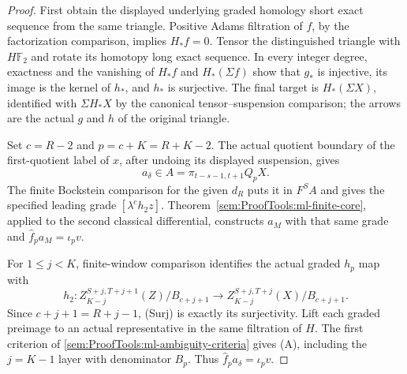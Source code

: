 \begin{proof}
First obtain the displayed underlying graded homology short exact
sequence from the same triangle. Positive Adams filtration of $f$,
by the factorization comparison, implies $H_*f=0$.
Tensor the distinguished triangle with $H\mathbb F_2$ and rotate its
homotopy long exact sequence. In every integer degree, exactness
and the vanishing of $H_*f$ and $H_*(\Sigma f)$ show that $g_*$ is
injective, its image is the kernel of $h_*$, and $h_*$ is surjective.
The final target is $H_*(\Sigma X)$, identified with $\Sigma H_*X$
by the canonical tensor--suspension comparison; the arrows are the
actual $g$ and $h$ of the original triangle.

Set $c=R-2$ and $p=c+K=R+K-2$. The actual quotient boundary of the
first-quotient label of $x$, after undoing its displayed suspension, gives
\[
 a_\delta\in A=\pi_{t-s-1,t+1}Q_pX.
\]
The finite Bockstein comparison for the given $d_R$ puts it in $F^SA$
and gives the specified leading grade $[\lambda^ch_2z]$.
Theorem~\ref{sem:ProofTools:ml-finite-core}, applied to the second
classical differential, constructs $a_M$ with that same grade and
$\widehat f_pa_M=\iota_pv$.

For $1\leq j<K$, finite-window comparison identifies the actual graded
$h_p$ map with
\[
 h_2:Z_{K-j}^{S+j,T+j+1}(Z)/B_{c+j+1}
       \longrightarrow Z_{K-j}^{S+j,T+j}(X)/B_{c+j+1}.
\]
Since $c+j+1=R+j-1$, (Surj) is exactly its surjectivity.
Lift each graded preimage to an actual representative in the same
filtration of $H$. The first criterion of
\ref{sem:ProofTools:ml-ambiguity-criteria} gives (A), including the
$j=K-1$ layer with denominator $B_p$. Thus
$\widehat f_pa_\delta=\iota_pv$.


\end{proof}
